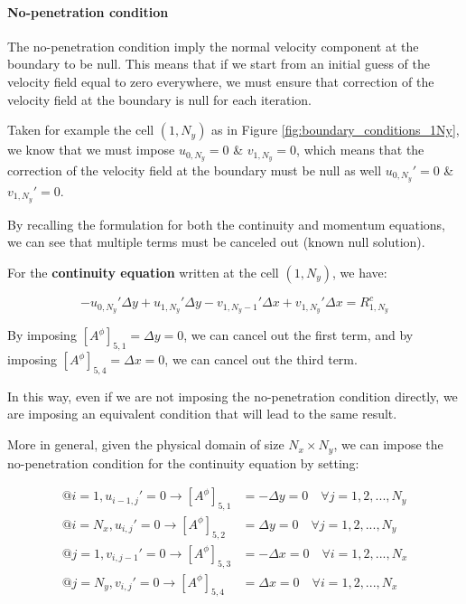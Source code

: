 \paragraph{No-penetration condition}

The no-penetration condition imply the normal velocity component at the boundary to be null.
This means that if we start from an initial guess of the velocity field equal to zero everywhere, we must ensure that correction of the velocity field at the boundary is null for each iteration.

Taken for example the cell $(1, N_y)$ as in Figure \ref{fig:boundary_conditions_1Ny}, we know that we must impose $u_{0, N_y} = 0$ \& $v_{1, N_y} = 0$, which means that the correction of the velocity field at the boundary must be null as well $u_{0, N_y}' = 0$ \& $v_{1, N_y}' = 0$.

By recalling the formulation for both the continuity and momentum equations, we can see that multiple terms must be canceled out (known null solution).

For the \textbf{continuity equation} written at the cell $(1, N_y)$, we have:

\begin{equation}
    -u_{0, N_y}' \Delta y + u_{1, N_y}' \Delta y - v_{1, N_y-1}' \Delta x + v_{1, N_y}' \Delta x = R_{1, N_y}^c
\end{equation}

By imposing $[A^\phi]_{5,1} = \Delta y = 0$, we can cancel out the first term, and by imposing $[A^\phi]_{5, 4} = \Delta x = 0$, we can cancel out the third term.

In this way, even if we are not imposing the no-penetration condition directly, we are imposing an equivalent condition that will lead to the same result.

More in general, given the physical domain of size $N_x \times N_y$, we can impose the no-penetration condition for the continuity equation by setting:

\begin{align}
    @i=1, u_{i-1, j}' = 0 \rightarrow [A^\phi]_{5,1} & = - \Delta y = 0 \quad \forall j = 1,2,...,N_y \\
    @i=N_x, u_{i, j}' = 0 \rightarrow [A^\phi]_{5,2} & = \Delta y = 0 \quad \forall j = 1,2,...,N_y   \\
    @j=1, v_{i, j-1}' = 0 \rightarrow [A^\phi]_{5,3} & = - \Delta x = 0 \quad \forall i = 1,2,...,N_x \\
    @j=N_y, v_{i, j}' = 0 \rightarrow [A^\phi]_{5,4} & = \Delta x = 0 \quad \forall i = 1,2,...,N_x
\end{align}

